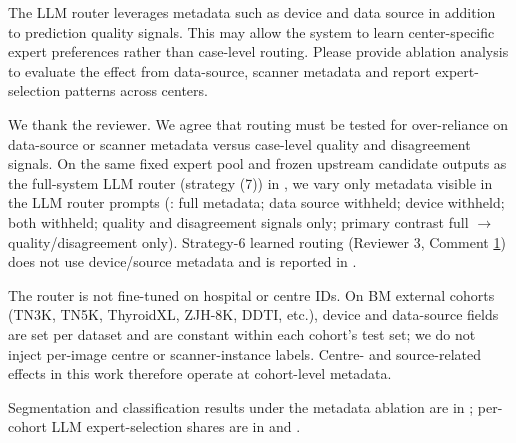 \label{rev:R3.2}
\begin{reviewercomment}
The LLM router leverages metadata such as device and data source in addition to prediction quality signals. This may allow the system to learn center-specific expert preferences rather than case-level routing. Please provide ablation analysis to evaluate the effect from data-source, scanner metadata and report expert-selection patterns across centers.
\end{reviewercomment}
\begin{authorresponse}
We thank the reviewer. We agree that routing must be tested for over-reliance on data-source or scanner metadata versus case-level quality and disagreement signals. On the same fixed expert pool and frozen upstream candidate outputs as the full-system LLM router (strategy (7)) in , we vary only metadata visible in the LLM router prompts (: full metadata; data source withheld; device withheld; both withheld; quality and disagreement signals only; primary contrast full $\rightarrow$ quality/disagreement only). Strategy-6 learned routing (Reviewer 3, Comment \hyperref[rev:R3.1]{1}) does not use device/source metadata and is reported in .\par
The router is not fine-tuned on hospital or centre IDs. On BM external cohorts (TN3K, TN5K, ThyroidXL, ZJH-8K, DDTI, etc.), device and data-source fields are set per dataset and are constant within each cohort's test set; we do not inject per-image centre or scanner-instance labels. Centre- and source-related effects in this work therefore operate at cohort-level metadata.\par
Segmentation and classification results under the metadata ablation are in ; per-cohort LLM expert-selection shares are in  and .\par
\par
\end{authorresponse}






